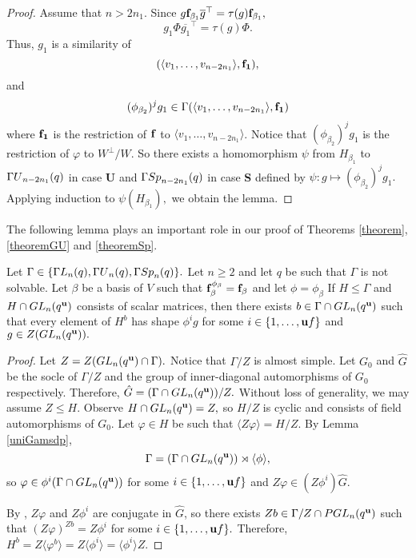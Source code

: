 \begin{proof}
Assume that $n>2n_1.$ Since $g {\bf f}_{\beta_1} \overline{g}^{\top}=\tau(g){\bf f}_{\beta_1},$ 
$$g_1 \Phi \overline{g_1}^{\top}=\tau(g)\Phi.$$
Thus, $g_1$ is a similarity of $$(\langle v_1, \ldots,  v_{n-2n_1} \rangle,{\bf f_1} ),$$
and $$(\phi_{\beta_2})^j g_1 \in \Gamma (\langle v_1, \ldots,  v_{n-2n_1} \rangle,{\bf f_1} )$$
where   ${\bf f_1}$ is the restriction of ${\bf f}$ to $\langle v_1, \ldots,  v_{n-2n_1} \rangle$. Notice that $(\phi_{\beta_2})^j g_1$ is the restriction of $\varphi$ to $W^{\bot}/W.$  So there exists a homomorphism $\psi$  from $H_{\beta_1}$ to ${{\Gamma U}}_{n-2n_1}(q)$ in case {\bf U} and ${{\Gamma Sp}}_{n-2n_1}(q)$ in case {\bf S} defined by 
$\psi:g \mapsto (\phi_{\beta_2})^j g_1.$ Applying induction to $\psi(H_{\beta_1}),$ we obtain  the lemma. 
\end{proof}

 The following lemma plays an important role in our proof of Theorems \ref{theorem}, \ref{theoremGU} and \ref{theoremSp}.

\begin{Lem}
\label{scfield}
Let  $\Gamma \in \{{{\Gamma L}}_n(q), {{\Gamma U}}_n(q), {{\Gamma Sp}}_n(q)\}.$ Let $n\ge 2$ and let $q$ be such that $\Gamma$ is not solvable. Let $\beta$ be a basis of $V$ such that ${\bf f}_{\beta}^{\phi_{\beta}}={\bf f}_{\beta}$ and let $\phi=\phi_{\beta}$ If $H \le \Gamma $ and  $H \cap GL_n(q^{\bf u})$ consists of scalar matrices, then there exists $b \in \Gamma \cap GL_n(q^{\bf u})$ such that every element of $H^b$ has shape $\phi^i g$ for some $i \in \{1, \ldots, {\bf u} f\}$ and $g \in Z(GL_n(q^{\bf u})).$   
\end{Lem}
\begin{proof}
 Let $Z=Z(GL_n(q^{\bf u}) \cap \Gamma).$ Notice that $\Gamma/Z$ is almost simple. Let $G_0$ and $\hat{G}$ be the socle of $\Gamma/Z$ and the group of inner-diagonal automorphisms of $G_0$ respectively. Therefore, $\hat{G}=(\Gamma \cap GL_n(q^{\bf u}))/Z.$ Without loss of generality, we may assume $Z \le H.$ Observe $H\cap GL_n(q^{\bf u}) = Z,$ so $H/Z$ is cyclic and consists of field automorphisms of $G_0.$ Let $\varphi \in H$ be such that $\langle Z \varphi \rangle=H/Z.$   By Lemma \ref{uniGamsdp},
$$\Gamma=(\Gamma \cap GL_n(q^{\bf u})) \rtimes \langle \phi \rangle,$$
so $\varphi \in \phi^i (\Gamma \cap GL_n(q^{\bf u}))$ for some  $i \in \{1, \ldots, {\bf u} f\}$ and $Z\varphi \in (Z\phi^i) \hat{G}$.

By \cite[(7-2)]{conjaut}, $Z \varphi$ and $Z \phi^i$ are conjugate in $\hat{G}$, so   there exists  $Zb \in \Gamma/Z \cap PGL_n(q^{\bf u})$ such that $(Z\varphi)^{Zb}=Z\phi^i$ for some $i \in \{1, \ldots, {\bf u} f\}.$  Therefore, $H^b = Z\langle \varphi^b \rangle = Z\langle \phi^i \rangle = \langle\phi^i \rangle Z.$
\end{proof}


